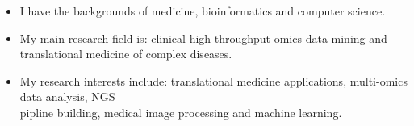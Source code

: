 
\begin{skills}
{\begin{itemize}
\item I have the backgrounds of medicine, bioinformatics and computer science.
\item My main research field is: clinical high throughput omics data mining and translational medicine of complex diseases. 
\item My research interests include: translational medicine applications, multi-omics data analysis, NGS \\
pipline building, medical image processing and machine learning.
\end{itemize}
}
\end{skills}

